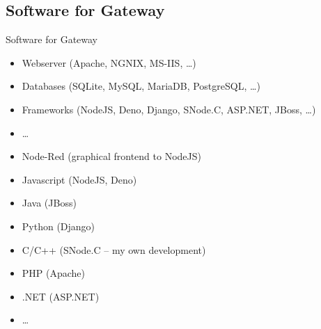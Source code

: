 ﻿\subsection{Software for Gateway}

\begin{frame}{Software for Gateway}
  \begin{description}[Languages]
    \item[Tools]
    \begin{itemize}
      \item Webserver (Apache, NGNIX, MS-IIS, \ldots)
      \item Databases (SQLite, MySQL, \alert<2>{MariaDB}, PostgreSQL, \ldots)
      \item Frameworks (\alert<2>{NodeJS}, Deno, Django, \alert<2>{SNode.C}, ASP.NET, JBoss, \ldots)
      \item \ldots
    \end{itemize}
    \item[Languages]
    \begin{itemize}
      \item \alert<2>{Node-Red (graphical frontend to NodeJS)}
      \item \alert<2>{Javascript} (\alert<2>{NodeJS}, Deno)
      \item Java (JBoss)
      \item Python (Django)
      \item \alert<2>{C/C++ (SNode.C -- my own development)}
      \item PHP (Apache)
      \item .NET (ASP.NET)
      \item \ldots
    \end{itemize}
  \end{description}
\end{frame}
